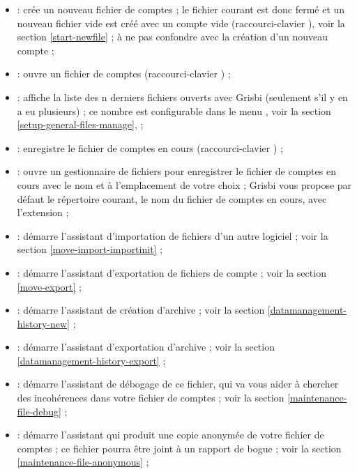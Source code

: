 \begin{itemize}
	\item {} : crée un nouveau fichier de comptes ; le fichier courant est donc fermé et un nouveau fichier vide est créé avec un compte vide (raccourci-clavier ), voir la section \vref{start-newfile} ; à ne pas confondre avec la création d'un nouveau compte ;
	\item {} : ouvre un fichier de comptes (raccourci-clavier ) ;
	\item {} : affiche la liste des n derniers fichiers ouverts avec Grisbi (seulement s'il y en a eu plusieurs) ; ce nombre est configurable dans le menu , voir la section \vref{setup-general-files-manage},  ;
	\item {} : enregistre le fichier de comptes en cours (raccourci-clavier ) ;
	\item {} : ouvre un gestionnaire de fichiers pour enregistrer le fichier de comptes en cours avec le nom et à l'emplacement de 	votre choix ; Grisbi vous propose par défaut le répertoire courant, le nom du fichier de comptes en cours, avec l'extension  ;
	\item {} : démarre l'assistant d'importation de fichiers d'un autre logiciel ; voir la section \vref{move-import-importinit} ;
	\item {} : démarre l'assistant d'exportation de fichiers de compte ; voir la section \vref{move-export} ;	
	\item {} : démarre l'assistant de création d'archive ; voir la section \vref{datamanagement-history-new} ;	
	\item {} : démarre l'assistant d'exportation d'archive ; voir la section \vref{datamanagement-history-export} ;
	\item {} : démarre l'assistant de 	débogage de ce fichier, qui va vous aider à chercher des incohérences dans votre fichier de comptes ; voir la section \vref{maintenance-file-debug} ;
	\item {} : démarre l'assistant qui produit une copie anonymée de votre fichier de comptes ; ce fichier pourra être joint à un rapport de bogue ; voir la section \vref{maintenance-file-anonymous} ;	

\end{itemize}
